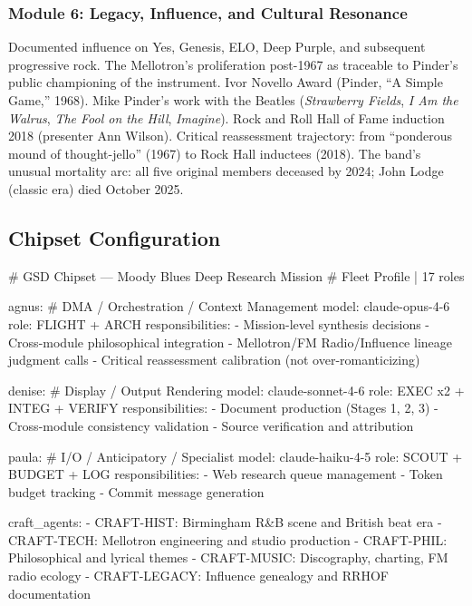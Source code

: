 \documentclass[11pt,letterpaper]{article}
\begin{document}
\subsubsection{Module 6: Legacy, Influence, and Cultural Resonance}

Documented influence on Yes, Genesis, ELO, Deep Purple, and subsequent progressive rock. The Mellotron's proliferation post-1967 as traceable to Pinder's public championing of the instrument. Ivor Novello Award (Pinder, ``A Simple Game,'' 1968). Mike Pinder's work with the Beatles (\textit{Strawberry Fields}, \textit{I Am the Walrus}, \textit{The Fool on the Hill}, \textit{Imagine}). Rock and Roll Hall of Fame induction 2018 (presenter Ann Wilson). Critical reassessment trajectory: from ``ponderous mound of thought-jello'' (1967) to Rock Hall inductees (2018). The band's unusual mortality arc: all five original members deceased by 2024; John Lodge (classic era) died October 2025.

\subsection{Chipset Configuration}

\begin{asciibox}
# GSD Chipset — Moody Blues Deep Research Mission
# Fleet Profile | 17 roles

agnus:                         # DMA / Orchestration / Context Management
  model: claude-opus-4-6
  role: FLIGHT + ARCH
  responsibilities:
    - Mission-level synthesis decisions
    - Cross-module philosophical integration
    - Mellotron/FM Radio/Influence lineage judgment calls
    - Critical reassessment calibration (not over-romanticizing)

denise:                        # Display / Output Rendering
  model: claude-sonnet-4-6
  role: EXEC x2 + INTEG + VERIFY
  responsibilities:
    - Document production (Stages 1, 2, 3)
    - Cross-module consistency validation
    - Source verification and attribution

paula:                         # I/O / Anticipatory / Specialist
  model: claude-haiku-4-5
  role: SCOUT + BUDGET + LOG
  responsibilities:
    - Web research queue management
    - Token budget tracking
    - Commit message generation

craft_agents:
  - CRAFT-HIST:   Birmingham R&B scene and British beat era
  - CRAFT-TECH:   Mellotron engineering and studio production
  - CRAFT-PHIL:   Philosophical and lyrical themes
  - CRAFT-MUSIC:  Discography, charting, FM radio ecology
  - CRAFT-LEGACY: Influence genealogy and RRHOF documentation
\end{asciibox}
\end{document}
